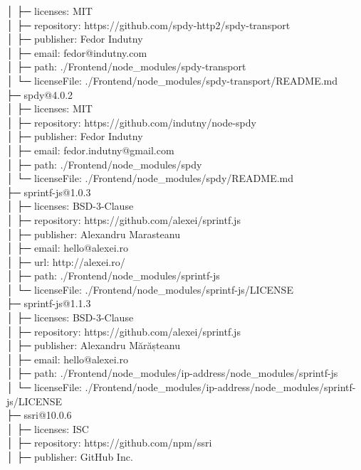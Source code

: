 │  ├─ licenses: MIT\\
│  ├─ repository: https://github.com/spdy-http2/spdy-transport\\
│  ├─ publisher: Fedor Indutny\\
│  ├─ email: fedor@indutny.com\\
│  ├─ path: ./Frontend/node\_modules/spdy-transport\\
│  └─ licenseFile: ./Frontend/node\_modules/spdy-transport/README.md\\
├─ spdy@4.0.2\\
│  ├─ licenses: MIT\\
│  ├─ repository: https://github.com/indutny/node-spdy\\
│  ├─ publisher: Fedor Indutny\\
│  ├─ email: fedor.indutny@gmail.com\\
│  ├─ path: ./Frontend/node\_modules/spdy\\
│  └─ licenseFile: ./Frontend/node\_modules/spdy/README.md\\
├─ sprintf-js@1.0.3\\
│  ├─ licenses: BSD-3-Clause\\
│  ├─ repository: https://github.com/alexei/sprintf.js\\
│  ├─ publisher: Alexandru Marasteanu\\
│  ├─ email: hello@alexei.ro\\
│  ├─ url: http://alexei.ro/\\
│  ├─ path: ./Frontend/node\_modules/sprintf-js\\
│  └─ licenseFile: ./Frontend/node\_modules/sprintf-js/LICENSE\\
├─ sprintf-js@1.1.3\\
│  ├─ licenses: BSD-3-Clause\\
│  ├─ repository: https://github.com/alexei/sprintf.js\\
│  ├─ publisher: Alexandru Mărășteanu\\
│  ├─ email: hello@alexei.ro\\
│  ├─ path: ./Frontend/node\_modules/ip-address/node\_modules/sprintf-js\\
│  └─ licenseFile: ./Frontend/node\_modules/ip-address/node\_modules/sprintf-js/LICENSE\\
├─ ssri@10.0.6\\
│  ├─ licenses: ISC\\
│  ├─ repository: https://github.com/npm/ssri\\
│  ├─ publisher: GitHub Inc.\\
